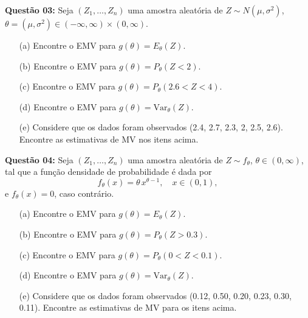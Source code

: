 \documentclass[a4paper]{article}
\begin{document}
\textbf{Questão 03:}  
Seja $(Z_1, \ldots, Z_n)$ uma amostra aleatória de $Z \sim N(\mu, \sigma^2)$, $\theta = (\mu, \sigma^2) \in (-\infty,\infty) \times (0,\infty)$.
\begin{itemize}
  \item[(a)] Encontre o EMV para $g(\theta) = E_\theta(Z)$.
  \item[(b)] Encontre o EMV para $g(\theta) = P_\theta(Z < 2)$.
  \item[(c)] Encontre o EMV para $g(\theta) = P_\theta(2.6 < Z < 4)$.
  \item[(d)] Encontre o EMV para $g(\theta) = \mathrm{Var}_\theta(Z)$.
  \item[(e)] Considere que os dados foram observados (2.4, 2.7, 2.3, 2, 2.5, 2.6). Encontre as estimativas de MV nos itens acima.
\end{itemize}
   
\begin{research}[]
 
    \end{research}
    \begin{answer}[]

    \end{answer}

\textbf{Questão 04:}  
Seja $(Z_1, \ldots, Z_n)$ uma amostra aleatória de $Z \sim f_\theta$, $\theta \in (0,\infty)$, tal que a função densidade de probabilidade é dada por  
\[
f_\theta(x) = \theta \, x^{\theta-1}, \quad x \in (0,1),
\]
e $f_\theta(x) = 0$, caso contrário.
\begin{itemize}
  \item[(a)] Encontre o EMV para $g(\theta) = E_\theta(Z)$.
  \item[(b)] Encontre o EMV para $g(\theta) = P_\theta(Z > 0.3)$.
  \item[(c)] Encontre o EMV para $g(\theta) = P_\theta(0 < Z < 0.1)$.
  \item[(d)] Encontre o EMV para $g(\theta) = \mathrm{Var}_\theta(Z)$.
  \item[(e)] Considere que os dados foram observados (0.12, 0.50, 0.20, 0.23, 0.30, 0.11). Encontre as estimativas de MV para os itens acima.
\end{itemize}
  
\begin{research}[]
 
    \end{research}
    \begin{answer}[]

    \end{answer}
\end{document}

